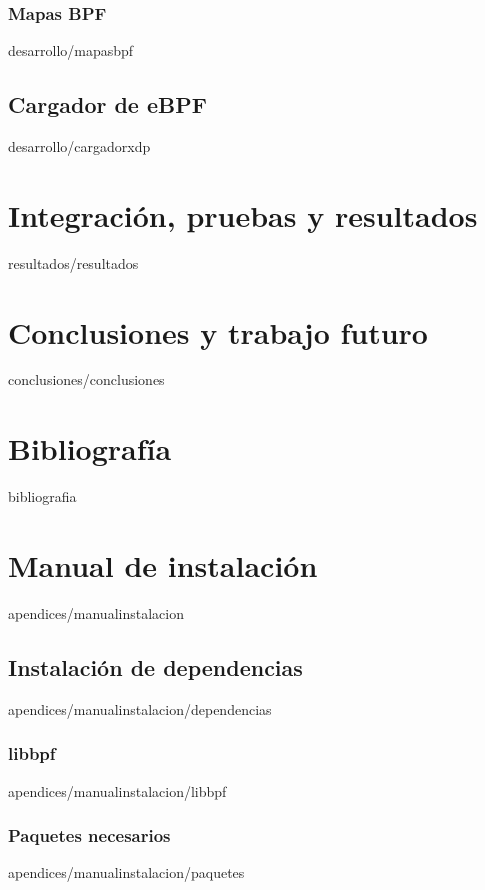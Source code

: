 \documentclass[epsbased,copyright,final,printable,covers,extendedindex,firstnumbered,tfg,gnuplot]{tfgtfmthesisuam}
\begin{document}
        \subsection{Mapas BPF\label{SEC:MAPASBPF}}{desarrollo/mapasbpf}
    \section{Cargador de eBPF\label{SEC:CARGADORXDP}}{desarrollo/cargadorxdp}
    
    


\chapter{Integración, pruebas y resultados\label{CAP:RESULTADOS}}{resultados/resultados}


\chapter{Conclusiones y trabajo futuro\label{CAP:CONCLUSIONES}}{conclusiones/conclusiones}

\chapter{Bibliografía\label{CAP:CONCLUSIONES}}{bibliografia}

\appendix

\chapter{Manual de instalación\label{CAP:INSTALACION}}{apendices/manualinstalacion}
  \section{Instalación de dependencias\label{SEC:DEPENDENCIAS}}{apendices/manualinstalacion/dependencias}
    \subsection{libbpf\label{SEC:LIBBPF}}{apendices/manualinstalacion/libbpf}
    \subsection{Paquetes necesarios\label{SEC:PAQUETES}}{apendices/manualinstalacion/paquetes}
    
\end{document}

